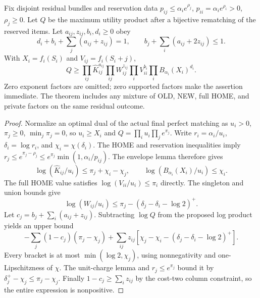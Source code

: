 \begin{theorem}\label{simp:completion}
Fix disjoint residual bundles and reservation data
$p_{ij}\le\alpha_i e^{\rho_j}$, $p_{ii}=\alpha_i e^{\rho_i}>0$, $\rho_j\ge0$.
Let $Q$ be the maximum utility product after a bijective rematching of the
reserved items.  Let $a_{ij},z_{ij},b_i,d_i\ge0$ obey
\[
 d_i+b_i+\sum_j(a_{ij}+z_{ij})=1,
 \qquad b_j+\sum_i(a_{ij}+2z_{ij})\le1.
\]
With $X_i=f_i(S_i)$ and $V_{ij}=f_i(S_i+j)$,
\[
 Q\ge
 \prod_{ij}\widehat K_{ij}^{a_{ij}}
 \prod_{ij}W_{ij}^{z_{ij}}
 \prod_iV_{ii}^{b_i}\prod_iB_{\alpha_i}(X_i)^{d_i}.
\]
Zero exponent factors are omitted; zero supported factors make the assertion
immediate.  The theorem includes any mixture of OLD, NEW, full HOME, and
private factors on the same residual outcome.
\end{theorem}
\begin{proof}
Normalize an optimal dual of the actual final perfect matching as
$u_i>0$, $\pi_j\ge0$, $\min_j\pi_j=0$, so $u_i\ge X_i$ and
$Q=\prod_i u_i\prod_j e^{\pi_j}$.
Write $r_i=\alpha_i/u_i$, $\delta_i=\log r_i$, and $\chi_i=\chi(\delta_i)$.
The HOME and reservation inequalities imply
$r_j\le e^{\pi_j-\rho_j}\le e^{\pi_j}\min(1,\alpha_i/p_{ij})$.
The envelope lemma therefore gives
\[
 \log(\widehat K_{ij}/u_i)\le\pi_j+\chi_i-\chi_j,
 \qquad \log(B_{\alpha_i}(X_i)/u_i)\le\chi_i.
\]
The full HOME value satisfies $\log(V_{ii}/u_i)\le\pi_i$ directly.
The singleton and union bounds give
\[
 \log(W_{ij}/u_i)\le
 \pi_j-(\delta_j-\delta_i-\log2)^+.
\]
Let $c_j=b_j+\sum_i(a_{ij}+z_{ij})$.  Subtracting $\log Q$ from the proposed
log product yields an upper bound
\[
 -\sum_j(1-c_j)(\pi_j-\chi_j)
 +\sum_{ij}z_{ij}
 [\chi_j-\chi_i-(\delta_j-\delta_i-\log2)^+].
\]
Every bracket is at most $\min(\log2,\chi_j)$, using nonnegativity and
one-Lipschitzness of $\chi$.  The unit-charge lemma and $r_j\le e^{\pi_j}$
bound it by $\delta_j^+-\chi_j\le\pi_j-\chi_j$.
Finally $1-c_j\ge\sum_i z_{ij}$ by the cost-two column constraint, so the
entire expression is nonpositive.
\end{proof}
